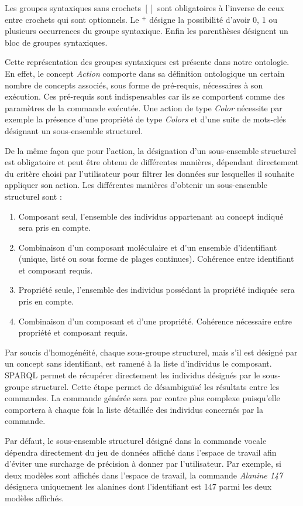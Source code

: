 Les groupes syntaxiques sans crochets $[]$ sont obligatoires à l'inverse de ceux entre crochets qui sont optionnels. Le $^+$ désigne la possibilité d'avoir 0, 1 ou plusieurs occurrences du groupe syntaxique. Enfin les parenthèses désignent un bloc de groupes syntaxiques.

Cette représentation des groupes syntaxiques est présente dans notre ontologie. En effet, le concept \textit{Action} comporte dans sa définition ontologique un certain nombre de concepts associés, sous forme de pré-requis, nécessaires à son exécution. Ces pré-requis sont indispensables car ils se comportent comme des paramètres de la commande exécutée. Une action de type \textit{Color} nécessite par exemple la présence d'une propriété de type \textit{Colors} et d'une suite de mots-clés désignant un sous-ensemble structurel. 

De la même façon que pour l'action, la désignation d'un sous-ensemble structurel est obligatoire et peut être obtenu de différentes manières, dépendant directement du critère choisi par l'utilisateur pour filtrer les données sur lesquelles il souhaite appliquer son action. Les différentes manières d'obtenir un sous-ensemble structurel sont :

\begin{enumerate}
  \item Composant seul, l'ensemble des individus appartenant au concept indiqué sera pris en compte.
  \item Combinaison d'un composant moléculaire et d'un ensemble d'identifiant (unique, listé ou sous forme de plages continues). Cohérence entre identifiant et composant requis.
  \item Propriété seule, l'ensemble des individus possédant la propriété indiquée sera pris en compte.
  \item Combinaison d'un composant et d'une propriété. Cohérence nécessaire entre propriété et composant requis.
\end{enumerate}

Par soucis d'homogénéité, chaque sous-groupe structurel, mais s'il est désigné par un concept sans identifiant, est ramené à la liste d'individus le composant. SPARQL permet de récupérer directement les individus désignés par le sous-groupe structurel. Cette étape permet de désambiguïsé les résultats entre les commandes. La commande générée sera par contre plus complexe puisqu'elle comportera à chaque fois la liste détaillée des individus concernés par la commande.

Par défaut, le sous-ensemble structurel désigné dans la commande vocale dépendra directement du jeu de données affiché dans l'espace de travail afin d'éviter une surcharge de précision à donner par l'utilisateur. Par exemple, si deux modèles sont affichés dans l'espace de travail, la commande \textit{Alanine 147} désignera uniquement les alanines dont l'identifiant est 147 parmi les deux modèles affichés.

